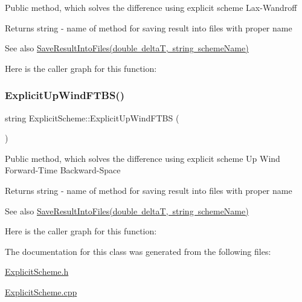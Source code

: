 Public method, which solves the difference using explicit scheme Lax-\/\+Wandroff \begin{DoxyReturn}{Returns}
string -\/ name of method for saving result into files with proper name 
\end{DoxyReturn}
\begin{DoxySeeAlso}{See also}
\mbox{\hyperlink{class_scheme_ae4512b4c8ead4d8ced95174f0b241f8a}{Save\+Result\+Into\+Files(double delta\+T, string scheme\+Name)}} 
\end{DoxySeeAlso}
Here is the caller graph for this function\+:
\mbox{\label{class_explicit_scheme_a52c0d19315a6014f43a9d007c70582d6}} 
\subsubsection{\texorpdfstring{Explicit\+Up\+Wind\+F\+T\+B\+S()}{ExplicitUpWindFTBS()}}
{\footnotesize\ttfamily string Explicit\+Scheme\+::\+Explicit\+Up\+Wind\+F\+T\+BS (\begin{DoxyParamCaption}{ }\end{DoxyParamCaption})}

Public method, which solves the difference using explicit scheme Up Wind Forward-\/\+Time Backward-\/\+Space \begin{DoxyReturn}{Returns}
string -\/ name of method for saving result into files with proper name 
\end{DoxyReturn}
\begin{DoxySeeAlso}{See also}
\mbox{\hyperlink{class_scheme_ae4512b4c8ead4d8ced95174f0b241f8a}{Save\+Result\+Into\+Files(double delta\+T, string scheme\+Name)}} 
\end{DoxySeeAlso}
Here is the caller graph for this function\+:


The documentation for this class was generated from the following files\+:\begin{DoxyCompactItemize}
\item 
\mbox{\hyperlink{_explicit_scheme_8h}{Explicit\+Scheme.\+h}}\item 
\mbox{\hyperlink{_explicit_scheme_8cpp}{Explicit\+Scheme.\+cpp}}\end{DoxyCompactItemize}
